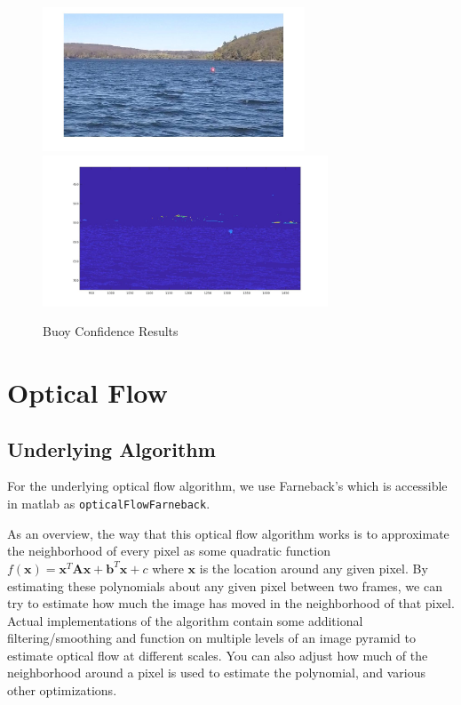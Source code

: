 \documentclass{article}
\begin{document}
\begin{figure}[H]
\label{fig:buoyconf}
\includegraphics[width=7.8cm]{hsv_kmeans2_buoy}
\includegraphics[width=8.5cm]{hsv_kmeans2_buoy_result}
\centering
\caption{Buoy Confidence Results}
\end{figure}

\section{Optical Flow}

\subsection{Underlying Algorithm}

For the underlying optical flow algorithm, we use Farneback's
\cite{farneback2003} which is accessible in matlab as
\texttt{opticalFlowFarneback}.

As an overview, the way that this optical flow algorithm works is to
approximate the neighborhood of every pixel as some quadratic function
$f(\mathbf{x}) = \mathbf{x}^T \mathbf{A} \mathbf{x} + \mathbf{b}^T \mathbf{x} + c$
where $\mathbf{x}$ is the location around any given pixel. By estimating these
polynomials about any given pixel between two frames, we can try to estimate how
much the image has moved in the neighborhood of that pixel. Actual
implementations of the algorithm contain some additional filtering/smoothing and
function on multiple levels of an image pyramid to estimate optical flow at
different scales. You can also adjust how much of the neighborhood around a
pixel is used to estimate the polynomial, and various other optimizations.
\end{document}
